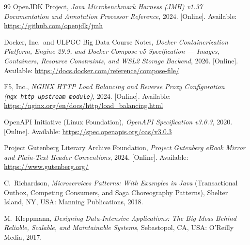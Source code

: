 \documentclass[10pt,a4paper]{article}
\begin{document}
\begin{thebibliography}{99}
OpenJDK Project,
\emph{Java Microbenchmark Harness (JMH) v1.37 Documentation and Annotation Processor Reference},
2024. [Online]. Available: \url{https://github.com/openjdk/jmh}

Docker, Inc.\ and ULPGC Big Data Course Notes,
\emph{Docker Containerization Platform, Engine 29.9, and Docker Compose v5 Specification --- Images, Containers, Resource Constraints, and WSL2 Storage Backend},
2026. [Online]. Available: \url{https://docs.docker.com/reference/compose-file/}

F5, Inc.,
\emph{NGINX HTTP Load Balancing and Reverse Proxy Configuration (\texttt{ngx\_http\_upstream\_module})},
2024. [Online]. Available: \url{https://nginx.org/en/docs/http/load_balancing.html}

OpenAPI Initiative (Linux Foundation),
\emph{OpenAPI Specification v3.0.3},
2020. [Online]. Available: \url{https://spec.openapis.org/oas/v3.0.3}

Project Gutenberg Literary Archive Foundation,
\emph{Project Gutenberg eBook Mirror and Plain-Text Header Conventions},
2024. [Online]. Available: \url{https://www.gutenberg.org/}

C.~Richardson,
\emph{Microservices Patterns: With Examples in Java} (Transactional Outbox, Competing Consumers, and Saga Choreography Patterns),
Shelter Island, NY, USA: Manning Publications, 2018.

M.~Kleppmann,
\emph{Designing Data-Intensive Applications: The Big Ideas Behind Reliable, Scalable, and Maintainable Systems},
Sebastopol, CA, USA: O'Reilly Media, 2017.

\end{thebibliography}
\end{document}
